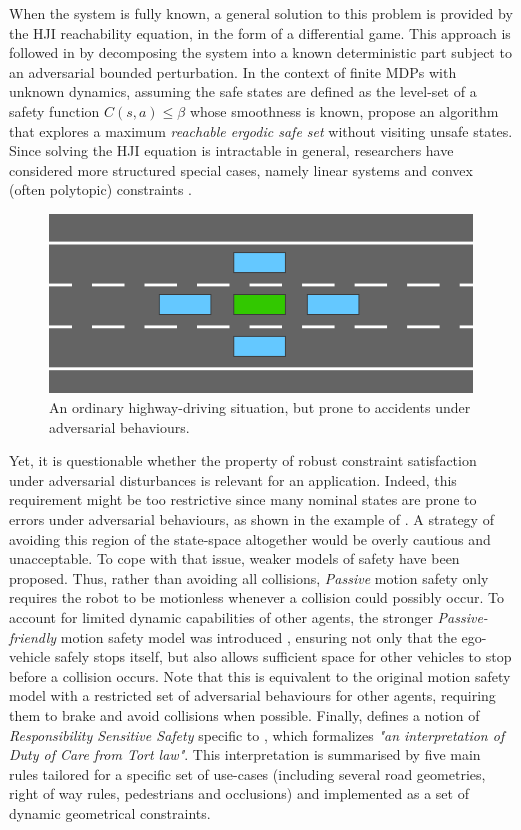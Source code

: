 When the system is fully known, a general solution to this problem is provided by the \gls{HJI} reachability equation, in the form of a differential game. This approach is followed in \citep{leung2018infusing,Fisac2019} by decomposing the system into a known deterministic part subject to an adversarial bounded perturbation. In the context of finite \glspl{MDP} with unknown dynamics, 
assuming the safe states are defined as the level-set of a safety function  $C(s,a) \leq \beta$ whose smoothness is known, \citet{Turchetta2016} propose an algorithm that explores a maximum \emph{reachable ergodic safe set} without visiting unsafe states.
Since solving the \gls{HJI} equation is intractable in general, researchers have considered more structured special cases, namely linear systems and convex (often polytopic) constraints \citep{Fukushima2007,Adetola2009,Aswani2013,Lorenzen2017,Kohler2019,Lu2019}.

\begin{figure}[ht]
	\centering
	\includegraphics[width=0.45\linewidth]{img/safety_no_2_small}
	\caption{An ordinary highway-driving situation, but prone to accidents under adversarial behaviours.}
	\label{fig:no-safety}
\end{figure}
Yet, it is questionable whether the property of robust constraint satisfaction under adversarial disturbances is relevant for an  application. Indeed, this requirement might be too restrictive since many nominal states are prone to errors under adversarial behaviours, as shown in the example of . A strategy of avoiding this region of the state-space altogether would be overly cautious and unacceptable. To cope with that issue, weaker models of safety have been proposed. Thus, rather than avoiding all collisions, \emph{Passive} motion safety \citep{Macek2009,Bouraine2012,Bouraine2014} only requires the robot to be motionless whenever a collision could possibly occur. To account for limited dynamic capabilities of other agents, the stronger \emph{Passive-friendly} motion safety model was introduced \citep{Mitsch2017}, ensuring not only that the ego-vehicle safely stops itself, but also allows sufficient space for other vehicles to stop before a collision occurs. Note that this is equivalent to the original motion safety model with a restricted set of adversarial behaviours for other agents, requiring them to brake and avoid collisions when possible. Finally, \citet{ShalevShwartz2017} defines a notion of \emph{Responsibility Sensitive Safety} specific to , which formalizes \emph{"an interpretation of \emph{Duty of Care} from Tort law"}. This interpretation is summarised by five main rules tailored for a specific set of use-cases (including several road geometries, right of way rules, pedestrians and occlusions) and implemented as a set of dynamic geometrical constraints.


